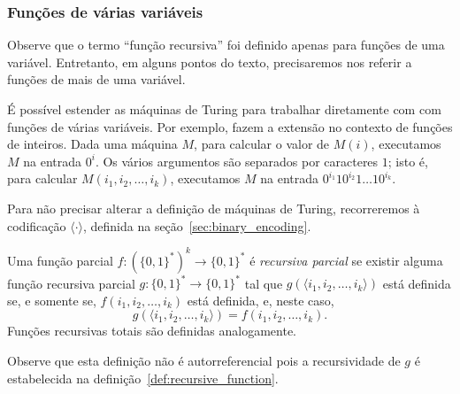 
\subsubsection{Funções de várias variáveis}

Observe que o termo ``função recursiva''
foi definido apenas para funções de uma variável.
Entretanto,
em alguns pontos do texto,
precisaremos nos referir a funções de mais de uma variável.

É possível estender as máquinas de Turing
para trabalhar diretamente com com funções de várias variáveis.
Por exemplo, 
fazem a extensão no contexto de funções de inteiros.
Dada uma máquina $M$,
para calcular o valor de $M(i)$,
executamos $M$ na entrada $0^i$.
Os vários argumentos são separados por caracteres $1$;
isto é, para calcular $M(i_1, i_2, \dots, i_k)$,
executamos $M$ na entrada $0^{i_1} 1 0^{i_2} 1 \dots 1 0^{i_k}$.

Para não precisar alterar a definição de máquinas de Turing,
recorreremos à codificação $\langle \cdot \rangle$,
definida na seção~\ref{sec:binary_encoding}.

\begin{definition}
    Uma função parcial $f: (\{0, 1\}^*)^k \to \{0, 1\}^*$ é \emph{recursiva parcial}
    se existir alguma função recursiva parcial $g: \{0, 1\}^* \to \{0, 1\}^*$
    tal que $g(\langle i_1, i_2, \dots, i_k \rangle)$
    está definida se, e somente se, $f(i_1, i_2, \dots, i_k)$ está definida,
    e, neste caso,
    \begin{equation*}
        g(\langle i_1, i_2, \dots, i_k \rangle) = f(i_1, i_2, \dots, i_k).
    \end{equation*}
    Funções recursivas totais são definidas analogamente.
\end{definition}

Observe que esta definição não é autorreferencial
pois a recursividade de $g$ é estabelecida na definição~\ref{def:recursive_function}.

